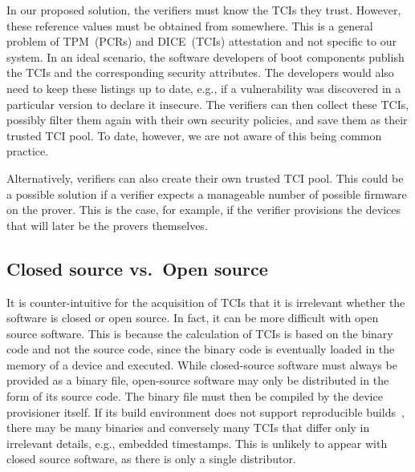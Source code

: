 In our proposed solution, the verifiers must know the TCIs they trust.
However, these reference values must be obtained from somewhere.
This is a general problem of TPM~(PCRs) and DICE~(TCIs) attestation and not specific to our system.
In an ideal scenario, the software developers of boot components publish the TCIs and the corresponding security attributes.
The developers would also need to keep these listings up to date, e.g., if a vulnerability was discovered in a particular version to declare it insecure.
The verifiers can then collect these TCIs, possibly filter them again with their own security policies, and save them as their trusted TCI pool.
To date, however, we are not aware of this being common practice.

Alternatively, verifiers can also create their own trusted TCI pool.
This could be a possible solution if a verifier expects a manageable number of possible firmware on the prover.
This is the case, for example, if the verifier provisions the devices that will later be the provers themselves.

\subsection{Closed source vs.\ Open source}

It is counter-intuitive for the acquisition of TCIs that it is irrelevant whether the software is closed or open source.
In fact, it can be more difficult with open source software.
This is because the calculation of TCIs is based on the binary code and not the source code, since the binary code is eventually loaded in the memory of a device and executed.
While closed-source software must always be provided as a binary file, open-source software may only be distributed in the form of its source code.
The binary file must then be compiled by the device provisioner itself.
If its build environment does not support reproducible builds~\cite{Lamb2022}, there may be many binaries and conversely many TCIs that differ only in irrelevant details, e.g., embedded timestamps.
This is unlikely to appear with closed source software, as there is only a single distributor.

